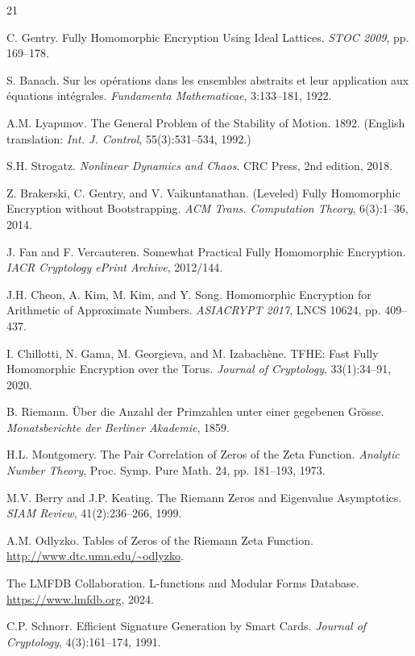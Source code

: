 \documentclass[11pt,a4paper]{article}
\begin{document}
\begin{thebibliography}{21}

 C. Gentry. Fully Homomorphic Encryption Using Ideal Lattices. \textit{STOC 2009}, pp. 169--178.

 S. Banach. Sur les op\'erations dans les ensembles abstraits et leur application aux \'equations int\'egrales. \textit{Fundamenta Mathematicae}, 3:133--181, 1922.

 A.M. Lyapunov. The General Problem of the Stability of Motion. 1892. (English translation: \textit{Int. J. Control}, 55(3):531--534, 1992.)

 S.H. Strogatz. \textit{Nonlinear Dynamics and Chaos}. CRC Press, 2nd edition, 2018.

 Z. Brakerski, C. Gentry, and V. Vaikuntanathan. (Leveled) Fully Homomorphic Encryption without Bootstrapping. \textit{ACM Trans. Computation Theory}, 6(3):1--36, 2014.

 J. Fan and F. Vercauteren. Somewhat Practical Fully Homomorphic Encryption. \textit{IACR Cryptology ePrint Archive}, 2012/144.

 J.H. Cheon, A. Kim, M. Kim, and Y. Song. Homomorphic Encryption for Arithmetic of Approximate Numbers. \textit{ASIACRYPT 2017}, LNCS 10624, pp. 409--437.

 I. Chillotti, N. Gama, M. Georgieva, and M. Izabach\`ene. TFHE: Fast Fully Homomorphic Encryption over the Torus. \textit{Journal of Cryptology}, 33(1):34--91, 2020.

 B. Riemann. \"Uber die Anzahl der Primzahlen unter einer gegebenen Gr\"osse. \textit{Monatsberichte der Berliner Akademie}, 1859.

 H.L. Montgomery. The Pair Correlation of Zeros of the Zeta Function. \textit{Analytic Number Theory}, Proc. Symp. Pure Math. 24, pp. 181--193, 1973.

 M.V. Berry and J.P. Keating. The Riemann Zeros and Eigenvalue Asymptotics. \textit{SIAM Review}, 41(2):236--266, 1999.

 A.M. Odlyzko. Tables of Zeros of the Riemann Zeta Function. \url{http://www.dtc.umn.edu/~odlyzko}.

 The LMFDB Collaboration. L-functions and Modular Forms Database. \url{https://www.lmfdb.org}, 2024.

 C.P. Schnorr. Efficient Signature Generation by Smart Cards. \textit{Journal of Cryptology}, 4(3):161--174, 1991.


\end{thebibliography}
\end{document}
